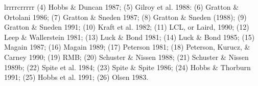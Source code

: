 \begin{deluxetable}{lrrrrcrrrrr}
{(4) Hobbs \& Duncan 1987; (5) Gilroy et al. 1988: (6) Gratton \& Ortolani 1986;
(7) Gratton \& Sneden 1987; (8) Gratton \& Sneden (1988); (9) Gratton \& Sneden 1991;
(10) Kraft et al. 1982; (11) LCL, or Laird, 1990; (12) Leep \& Wallerstein 1981;
(13) Luck \& Bond 1981; (14) Luck \& Bond 1985; (15) Magain 1987;
(16) Magain 1989; (17) Peterson 1981; (18) Peterson, Kurucz, \& Carney 1990;
(19) RMB; (20) Schuster \& Nissen 1988; (21) Schuster \& Nissen 1989b;
(22) Spite et al. 1984; (23) Spite \& Spite 1986; (24) Hobbs \& Thorburn 1991;
(25) Hobbs et al. 1991; (26) Olsen 1983.}
\enddata
\end{deluxetable}


